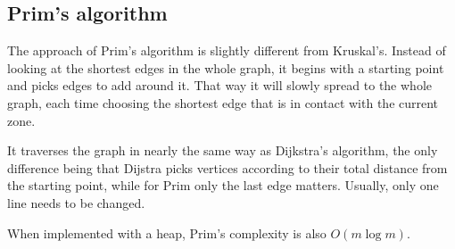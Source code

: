 \subsection{Prim's algorithm}

The approach of Prim's algorithm is slightly different from Kruskal's.
Instead of looking at the shortest edges in the whole graph,
it begins with a starting point and picks edges to add around it.
That way it will slowly spread to the whole graph,
each time choosing the shortest edge that is in contact with the current zone.

It traverses the graph in nearly the same way as Dijkstra's algorithm,
the only difference being that Dijstra picks vertices according to their total
distance from the starting point, while for Prim only the last edge matters.
Usually, only one line needs to be changed.

When implemented with a heap, Prim's complexity is also
$O(m\log m)$.
